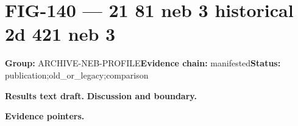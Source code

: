 \clearpage
\section{FIG-140 --- 21 81 neb 3 historical 2d 421 neb 3}
\label{figpage:fig-140}
\textbf{Group:} ARCHIVE-NEB-PROFILE\quad \textbf{Evidence chain:} manifested\quad \textbf{Status:} publication;old\_or\_legacy;comparison

\textbf{Results text draft.} 
\textbf{Discussion and boundary.} 


\textbf{Evidence pointers.}



\vfill
